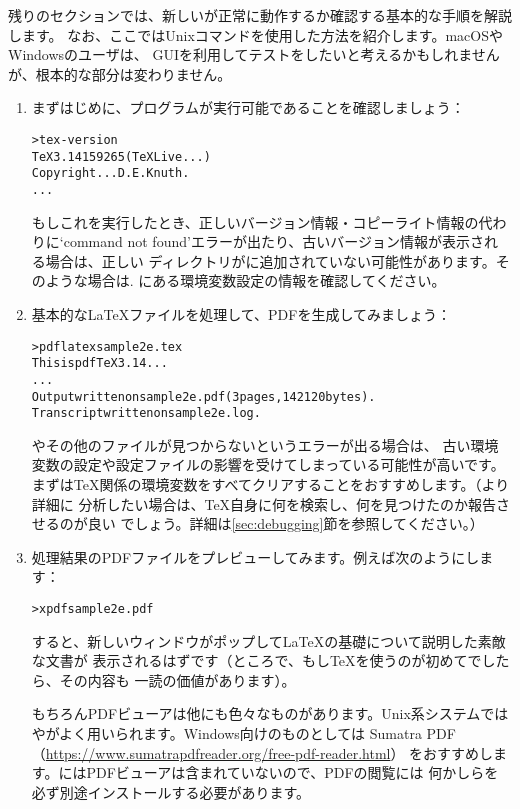 \documentclass[uplatex,dvipdfmx,12pt]{jsarticle}
\begin{document}
残りのセクションでは、新しい\TL が正常に動作するか確認する基本的な手順を解説します。
なお、ここではUnixコマンドを使用した方法を紹介します。macOSやWindowsのユーザは、
GUIを利用してテストをしたいと考えるかもしれませんが、根本的な部分は変わりません。

\begin{enumerate}
\item まずはじめに、プログラムが実行可能であることを確認しましょう：
%
\begin{alltt}
> tex -version
TeX 3.14159265 (TeX Live ...)
Copyright ... D.E. Knuth.
...
\end{alltt}
%
もしこれを実行したとき、正しいバージョン情報・コピーライト情報の代わりに`command
not found'エラーが出たり、古いバージョン情報が表示される場合は、正しい%
ディレクトリがに追加されていない可能性があります。そのような場合は\p.%
\pageref{sec:env}にある環境変数設定の情報を確認してください。

\item 基本的な\LaTeX ファイルを処理して、PDFを生成してみましょう：
%
\begin{alltt}
> pdflatex sample2e.tex
This is pdfTeX 3.14...
...
Output written on sample2e.pdf (3 pages, 142120 bytes).
Transcript written on sample2e.log.
\end{alltt}
%
やその他のファイルが見つからないというエラーが出る場合は、
古い環境変数の設定や設定ファイルの影響を受けてしまっている可能性が高いです。
まずは\TeX 関係の環境変数をすべてクリアすることをおすすめします。（より詳細に
分析したい場合は、\TeX 自身に何を検索し、何を見つけたのか報告させるのが良い
でしょう。詳細は\ref{sec:debugging}節を参照してください。）

\item 処理結果のPDFファイルをプレビューしてみます。例えば次のようにします：
%
\begin{alltt}
> xpdf sample2e.pdf
\end{alltt}
%
すると、新しいウィンドウがポップして\LaTeX の基礎について説明した素敵な文書が
表示されるはずです（ところで、もし\TeX を使うのが初めてでしたら、その内容も
一読の価値があります）。

もちろんPDFビューアは他にも色々なものがあります。Unix系システムでは
やがよく用いられます。Windows向けのものとしては
Sumatra PDF（\url{https://www.sumatrapdfreader.org/free-pdf-reader.html}）
をおすすめします。\TL にはPDFビューアは含まれていないので、PDFの閲覧には
何かしらを必ず別途インストールする必要があります。


\end{enumerate}
\end{document}
